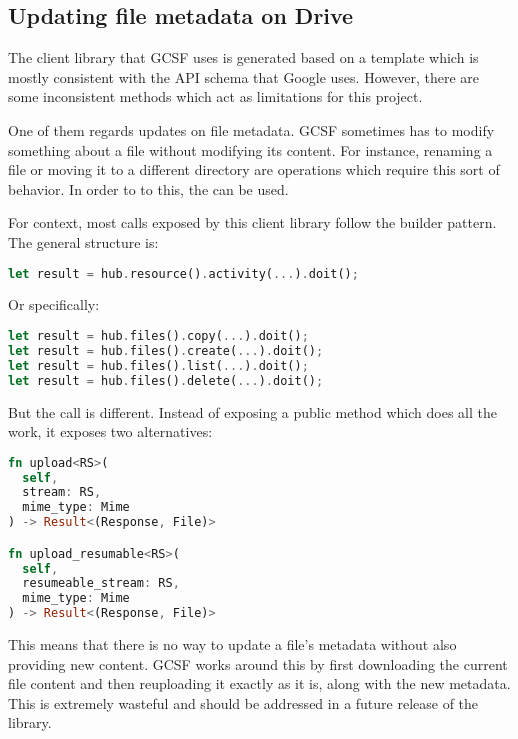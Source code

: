 \subsection{Updating file metadata on Drive} \label{updating_metadata}

The client library that GCSF uses is generated based on a template which is mostly consistent with the API schema that Google uses. However, there are some inconsistent methods which act as limitations for this project.

One of them regards updates on file metadata. GCSF sometimes has to modify something about a file without modifying its content. For instance, renaming a file or moving it to a different directory are operations which require this sort of behavior. In order to to this, the  can be used.

For context, most calls exposed by this client library follow the builder pattern\cite{gof}. The general structure is:

\begin{lstlisting}[language=Rust, caption=Setting file attributes, frame=single]
let result = hub.resource().activity(...).doit();
\end{lstlisting}

Or specifically:

\begin{lstlisting}[language=Rust, caption=Setting file attributes, frame=single]
let result = hub.files().copy(...).doit();
let result = hub.files().create(...).doit();
let result = hub.files().list(...).doit();
let result = hub.files().delete(...).doit();
\end{lstlisting}

But the  call is different. Instead of exposing a public  method which does all the work, it exposes two alternatives:

\begin{lstlisting}[language=Rust, caption=Setting file attributes, frame=single]
fn upload<RS>(
  self,
  stream: RS,
  mime_type: Mime
) -> Result<(Response, File)>

fn upload_resumable<RS>(
  self,
  resumeable_stream: RS,
  mime_type: Mime
) -> Result<(Response, File)>
\end{lstlisting}

This means that there is no way to update a file's metadata without also providing new content. GCSF works around this by first downloading the current file content and then reuploading it exactly as it is, along with the new metadata. This is extremely wasteful and should be addressed in a future release of the library.

